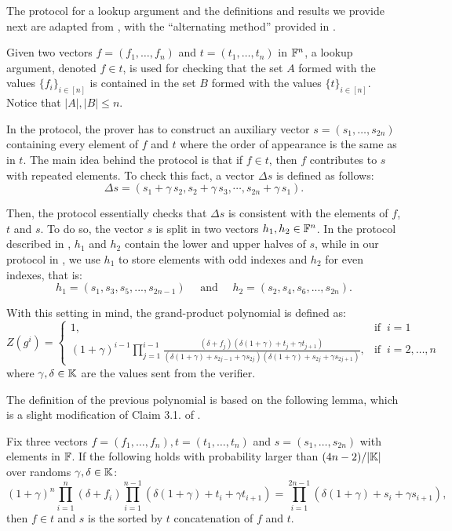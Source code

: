 The protocol for a lookup argument and the definitions and results we provide next are adapted from \cite{EPRINT:GabWil20}, with the ``alternating method''  provided in \cite{EPRINT:PFMBM22}.

Given two vectors $f = (f_1, \dots, f_n)$ and $t = (t_1, \dots, t_n)$ in $\mathbb{F}^n$, a lookup argument, denoted $f \in t$, is used for checking that the set $A$ formed with the values $\{f_i\}_{i\in[n]}$ is contained in the set $B$ formed with the values $\{t\}_{i\in[n]}$. Notice that $|A|,|B|\leq n$.

In the protocol, the prover has to construct an auxiliary vector $s = (s_1, \dots, s_{2n})$ containing every element of $f$ and $t$ where the order of appearance is the same as in $t$.
The main idea behind the protocol is that if $f \in t$, then $f$ contributes to $s$ with repeated elements.
To check this fact, a vector $\Delta{s}$ is defined as follows:
\[
\Delta{s} = (s_1+\gamma\,s_2, s_2+\gamma\,s_3, \cdots, s_{2n}+\gamma\,s_1).
\]

Then, the protocol essentially checks that $\Delta{s}$ is consistent with the elements of $f$, $t$ and $s$.
To do so, the vector $s$ is split in two vectors $h_1,h_2 \in \mathbb{F}^n$.
In the protocol described in \cite{EPRINT:GabWil20},
$h_1$ and $h_2$ contain the lower and upper halves of $s$, while in our protocol in \cite{EPRINT:PFMBM22}, we use $h_1$ to store elements with odd indexes and $h_2$ for even indexes, that is:
\begin{equation}\label{eq:alternating-method}
h_1 = (s_1, s_3, s_5, ..., s_{2n-1}) \quad\text{ and }\quad
h_2 = (s_2, s_4, s_6, ..., s_{2n}).
\end{equation}

With this setting in mind, the grand-product polynomial is defined as:
\[
  Z(g^i) = 
  \begin{cases} 
  1, & \text{if }~ i=1 \\ 
  \displaystyle (1+\gamma)^{i-1}\prod_{j=1}^{i-1}\frac{{(\delta + f_j)}   (\delta(1+\gamma) + t_j + \gamma t_{j+1})}{ (\delta(1+\gamma) + s_{2j-1} + \gamma s_{2j})(\delta(1+\gamma) + s_{2j} + \gamma s_{2j+1})}, & \text{if }~ i = 2, \dots, n
  \end{cases} 
\]
where $\gamma,\delta \in \mathbb{K}$ are the values sent from the verifier.

The definition of the previous polynomial is based on the following lemma, which is a slight modification of Claim 3.1. of \cite{EPRINT:GabWil20}.
\begin{lemma}\label{lemma:lookup-soundness}
  Fix three vectors $f = (f_1, \dots, f_n),t = (t_1, \dots, t_n)$ and $s = (s_1,\dots,s_{2n})$ with elements in $\mathbb{F}$. If the following holds with probability larger than $(4n-2)/|\mathbb{K}|$ over randoms $\gamma, \delta \in \mathbb{K}$:
  \begin{equation*}
    (1+\gamma)^n\prod_{i=1}^n (\delta + f_i)\prod_{i=1}^{n-1} (\delta(1+\gamma) + t_i + \gamma t_{i+1}) = \prod_{i=1}^{2n-1} (\delta(1+\gamma) + s_i + \gamma s_{i+1}),
  \end{equation*}
  then $f \in t$ and $s$ is the sorted by $t$ concatenation of $f$ and $t$. 
\end{lemma}

